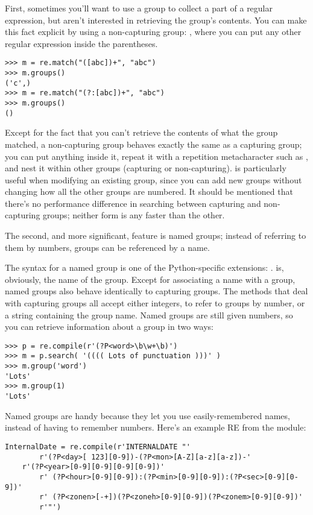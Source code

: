 \documentclass{howto}
\begin{document}
First, sometimes you'll want to use a group to collect a part of a
regular expression, but aren't interested in retrieving the group's
contents.  You can make this fact explicit by using a non-capturing
group: , where you can put any other regular
expression inside the parentheses.  

\begin{verbatim}
>>> m = re.match("([abc])+", "abc")
>>> m.groups()
('c',)
>>> m = re.match("(?:[abc])+", "abc")
>>> m.groups()
()
\end{verbatim}

Except for the fact that you can't retrieve the contents of what the
group matched, a non-capturing group behaves exactly the same as a
capturing group; you can put anything inside it, repeat it with a
repetition metacharacter such as \samp{*}, and nest it within other
groups (capturing or non-capturing).   is particularly
useful when modifying an existing group, since you can add new groups
without changing how all the other groups are numbered.  It should be
mentioned that there's no performance difference in searching between
capturing and non-capturing groups; neither form is any faster than
the other.

The second, and more significant, feature is named groups; instead of
referring to them by numbers, groups can be referenced by a name.

The syntax for a named group is one of the Python-specific extensions:
.   is, obviously, the name of
the group.  Except for associating a name with a group, named groups
also behave identically to capturing groups.  The 
methods that deal with capturing groups all accept either integers, to
refer to groups by number, or a string containing the group name.
Named groups are still given numbers, so you can retrieve information
about a group in two ways:

\begin{verbatim}
>>> p = re.compile(r'(?P<word>\b\w+\b)')
>>> m = p.search( '(((( Lots of punctuation )))' )
>>> m.group('word')
'Lots'
>>> m.group(1)
'Lots'
\end{verbatim}

Named groups are handy because they let you use easily-remembered
names, instead of having to remember numbers.  Here's an example RE
from the  module:

\begin{verbatim}
InternalDate = re.compile(r'INTERNALDATE "'
        r'(?P<day>[ 123][0-9])-(?P<mon>[A-Z][a-z][a-z])-'
	r'(?P<year>[0-9][0-9][0-9][0-9])'
        r' (?P<hour>[0-9][0-9]):(?P<min>[0-9][0-9]):(?P<sec>[0-9][0-9])'
        r' (?P<zonen>[-+])(?P<zoneh>[0-9][0-9])(?P<zonem>[0-9][0-9])'
        r'"')
\end{verbatim}
\end{document}
